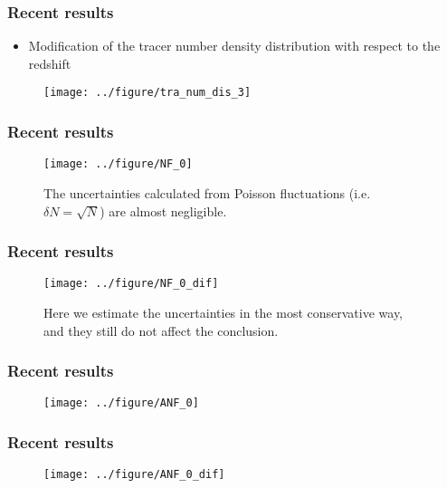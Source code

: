 \documentclass{beamer}
\newtheorem{Narrow down the analysis}{Narrow down the analysis}
\begin{document}
\begin{frame}
	\frametitle{Recent results}
	\begin{itemize}
	\item Modification of the tracer number density distribution with respect to the redshift
	\end{itemize}
	\begin{figure}
\centering
\texttt{[image: ../figure/tra\_num\_dis\_3]}
\label{ex1}
\end{figure}
\end{frame}

\begin{frame}
	\frametitle{Recent results}
\begin{figure}
\centering
\texttt{[image: ../figure/NF\_0]}
\caption{The uncertainties calculated from Poisson fluctuations (i.e. $\delta N=\sqrt{N}$) are almost negligible.}
\label{ex2}
\end{figure}
\end{frame}

\begin{frame}
	\frametitle{Recent results}
\begin{figure}
\centering
\texttt{[image: ../figure/NF\_0\_dif]}
\caption{Here we estimate the uncertainties in the most conservative way, and they still do not affect the conclusion.}
\label{ex3}
\end{figure}
\end{frame}

\begin{frame}
	\frametitle{Recent results}
\begin{figure}
\centering
\texttt{[image: ../figure/ANF\_0]}
\label{ex4}
\end{figure}
\end{frame}

\begin{frame}
	\frametitle{Recent results}
\begin{figure}
\centering
\texttt{[image: ../figure/ANF\_0\_dif]}
\label{ex5}
\end{figure}
\end{frame}
\end{document}
